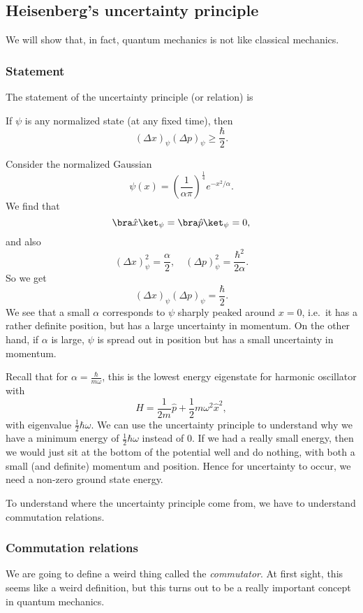 \documentclass[a4paper]{article}
\begin{document}
\subsection{Heisenberg's uncertainty principle}
We will show that, in fact, quantum mechanics is not like classical mechanics.

\subsubsection*{Statement}
The statement of the uncertainty principle (or relation) is
\begin{thm}
  If $\psi$ is any normalized state (at any fixed time), then
  \[
    (\Delta x)_\psi (\Delta p)_\psi \geq \frac{\hbar}{2}.
  \]
\end{thm}

\begin{eg}
  Consider the normalized Gaussian
  \[
    \psi(x) = \left(\frac{1}{\alpha \pi}\right)^{\frac{1}{4}} e^{-x^2/\alpha}.
  \]
  We find that
  \[
    \bra \hat{x}\ket_\psi = \bra \hat{p}\ket_\psi = 0,
  \]
  and also
  \[
    (\Delta x)_\psi^2 = \frac{\alpha}{2},\quad (\Delta p)_\psi^2 = \frac{\hbar^2}{2\alpha}.
  \]
  So we get
  \[
    (\Delta x)_\psi(\Delta p)_\psi = \frac{\hbar}{2}.
  \]
  We see that a small $\alpha$ corresponds to $\psi$ sharply peaked around $x = 0$, i.e.\ it has a rather definite position, but has a large uncertainty in momentum. On the other hand, if $\alpha$ is large, $\psi$ is spread out in position but has a small uncertainty in momentum.
\end{eg}
Recall that for $\alpha = \frac{\hbar}{m\omega}$, this is the lowest energy eigenstate for harmonic oscillator with
\[
  H = \frac{1}{2m}\hat{p} + \frac{1}{2}m\omega^2 \hat{x}^2,
\]
with eigenvalue $\frac{1}{2}\hbar \omega$. We can use the uncertainty principle to understand why we have a minimum energy of $\frac{1}{2}\hbar \omega$ instead of $0$. If we had a really small energy, then we would just sit at the bottom of the potential well and do nothing, with both a small (and definite) momentum and position. Hence for uncertainty to occur, we need a non-zero ground state energy.

To understand where the uncertainty principle come from, we have to understand commutation relations.
\subsubsection*{Commutation relations}
We are going to define a weird thing called the \emph{commutator}. At first sight, this seems like a weird definition, but this turns out to be a really important concept in quantum mechanics.
\end{document}
